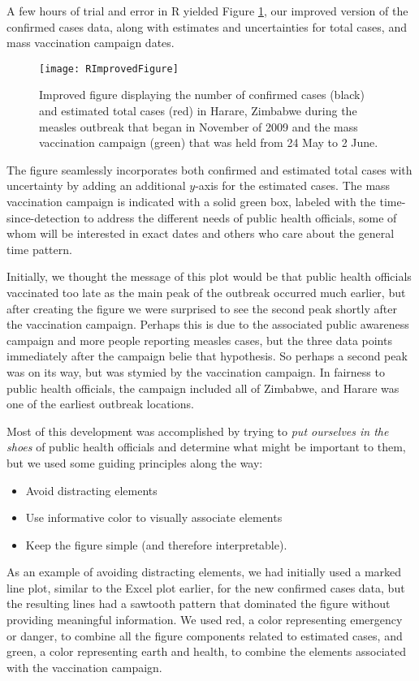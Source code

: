 \documentclass[12pt]{article}
\begin{document}
A few hours of trial and error in R yielded Figure \ref{fig:RImprovedFigure}, our improved version of the confirmed cases data, along with estimates and uncertainties for total cases, and mass vaccination campaign dates.
\begin{figure}[ht]
\centering
\texttt{[image: RImprovedFigure]}
\caption{Improved figure displaying the number of confirmed cases (black) and estimated total cases (red) in Harare, Zimbabwe during the measles outbreak that began in November of 2009 and the mass vaccination campaign (green) that was held from 24 May to 2 June.}
\label{fig:RImprovedFigure}
\end{figure}
The figure seamlessly incorporates both confirmed and estimated total cases with uncertainty by adding an additional $y$-axis for the estimated cases. The mass vaccination campaign is indicated with a solid green box, labeled with the time-since-detection to address the different needs of public health officials, some of whom will be interested in exact dates and others who care about the general time pattern.

Initially, we thought the message of this plot would be that public health officials vaccinated too late as the main peak of the outbreak occurred much earlier, but after creating the figure we were surprised to see the second peak shortly after the vaccination campaign. Perhaps this is due to the associated public awareness campaign and more people reporting measles cases, but the three data points immediately after the campaign belie that hypothesis. So perhaps a second peak was on its way, but was stymied by the vaccination campaign. In fairness to public health officials, the campaign included all of Zimbabwe, and Harare was one of the earliest outbreak locations. 

Most of this development was accomplished by trying to \emph{put ourselves in the shoes} of public health officials and determine what might be important to them, but we used some guiding principles along the way:
\begin{itemize}
\item Avoid distracting elements
\item Use informative color to visually associate elements
\item Keep the figure simple (and therefore interpretable).
\end{itemize}
As an example of avoiding distracting elements, we had initially used a marked line plot, similar to the Excel plot earlier, for the new confirmed cases data, but the resulting lines had a sawtooth pattern that dominated the figure without providing meaningful information. We used red, a color representing emergency or danger, to combine all the figure components related to estimated cases, and green, a color representing earth and health, to combine the elements associated with the vaccination campaign.
\end{document}
